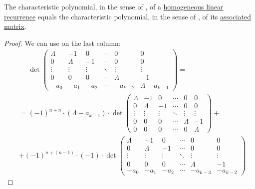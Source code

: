 \begin{proposition}\label{thm:linear_recurrence_characteristic_polynomial_via_matrix}
  The characteristic polynomial, in the sense of , of a \hyperref[def:homogeneous_linear_recurrence]{homogeneous linear recurrence} equals the characteristic polynomial, in the sense of , of its \hyperref[def:homogeneous_linear_recurrence_matrix]{associated matrix}.
\end{proposition}
\begin{proof}
  We can use  on the last column:
  \begin{align*}
    &\phantom{{}={}}
    \det \begin{pmatrix}
      \Lambda & -1      & 0       & \cdots & 0        & 0      \\
      0       & \Lambda & -1      & \cdots & 0        & 0      \\
      \vdots  & \vdots  & \vdots  & \ddots & \vdots   & \vdots \\
      0       & 0       & 0       & \cdots & \Lambda  & -1     \\
      -a_0    & -a_1    & -a_2    & \cdots & -a_{k-2} & \Lambda - a_{k-1}
    \end{pmatrix}
    = \\ &=
    (-1)^{n+n} \cdot (\Lambda - a_{k-1}) \cdot
    \det \begin{pmatrix}
      \Lambda & -1      & 0       & \cdots & 0       & 0      \\
      0       & \Lambda & -1      & \cdots & 0       & 0      \\
      \vdots  & \vdots  & \vdots  & \ddots & \vdots  & \vdots \\
      0       & 0       & 0       & \cdots & \Lambda & -1     \\
      0       & 0       & 0       & \cdots & 0       & \Lambda
    \end{pmatrix}
    + \\ &+
    (-1)^{n+(n-1)} \cdot (-1) \cdot
    \det \begin{pmatrix}
      \Lambda & -1      & 0       & \cdots & 0        & 0      \\
      0       & \Lambda & -1      & \cdots & 0        & 0      \\
      \vdots  & \vdots  & \vdots  & \ddots & \vdots   & \vdots \\
      0       & 0       & 0       & \cdots & \Lambda  & -1     \\
      -a_0    & -a_1    & -a_2    & \cdots & -a_{k-3} & -a_{k-2}
    \end{pmatrix}
  \end{align*}


\end{proof}
